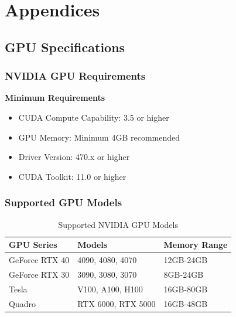 \documentclass[12pt,a4paper]{report}
\begin{document}
\chapter{Appendices}
\label{chap:appendix}

\section{GPU Specifications}
\label{sec:gpu-specs}

\subsection{NVIDIA GPU Requirements}
\begin{center}
\colorbox{secondarycolor}{
    \color{white}\textbf{Minimum Requirements}
}
\end{center}

\vspace{0.3cm}

\begin{itemize}
    \item CUDA Compute Capability: 3.5 or higher
    \item GPU Memory: Minimum 4GB recommended
    \item Driver Version: 470.x or higher
    \item CUDA Toolkit: 11.0 or higher
\end{itemize}

\subsection{Supported GPU Models}
\begin{table}[h]
    \centering
    \caption{Supported NVIDIA GPU Models}
    \label{tab:supported-gpus}
    \begin{tabular}{@{}lll@{}}
        \toprule
        \textbf{GPU Series} & \textbf{Models} & \textbf{Memory Range} \\
        \midrule
        GeForce RTX 40 & 4090, 4080, 4070 & 12GB-24GB \\
        GeForce RTX 30 & 3090, 3080, 3070 & 8GB-24GB \\
        Tesla & V100, A100, H100 & 16GB-80GB \\
        Quadro & RTX 6000, RTX 5000 & 16GB-48GB \\
        \bottomrule
    \end{tabular}
\end{table}
\end{document}
